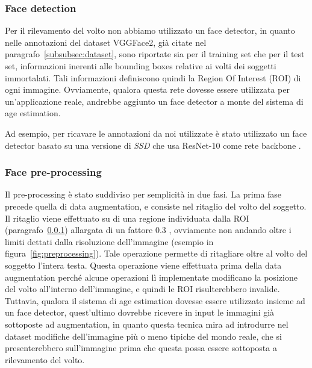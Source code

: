 \subsubsection{Face detection}
\label{subsubsec:face_detection}

Per il rilevamento del volto non abbiamo utilizzato un face detector, in quanto nelle annotazioni del dataset VGGFace2, già citate nel paragrafo~\ref{subsubsec:dataset}, sono riportate sia per il training set che per il test set, informazioni inerenti alle bounding boxes relative ai volti dei soggetti immortalati. Tali informazioni definiscono quindi la Region Of Interest (ROI) di ogni immagine.
Ovviamente, qualora questa rete dovesse essere utilizzata per un'applicazione reale, andrebbe aggiunto un face detector a monte del sistema di age estimation.

Ad esempio, per ricavare le annotazioni da noi utilizzate è stato utilizzato un face detector basato su una versione di \emph{SSD} che usa ResNet-10 come rete backbone \cite{miviagender}.

\subsubsection{Face pre-processing} 

Il pre-processing è stato suddiviso per semplicità in due fasi. La prima fase precede quella di data augmentation, e consiste nel ritaglio del volto del soggetto. Il ritaglio viene effettuato su di una regione individuata dalla ROI (paragrafo~\ref{subsubsec:face_detection}) allargata di un fattore $0.3$ \cite{vggface2dataset}, ovviamente non andando oltre i limiti dettati dalla risoluzione dell'immagine (esempio in figura~\ref{fig:preprocessing}). Tale operazione permette di ritagliare oltre al volto del soggetto l'intera testa. Questa operazione viene effettuata prima della data augmentation perché alcune operazioni lì implementate modificano la posizione del volto all'interno dell'immagine, e quindi le ROI risulterebbero invalide. Tuttavia, qualora il sistema di age estimation dovesse essere utilizzato insieme ad un face detector, quest'ultimo dovrebbe ricevere in input le immagini già sottoposte ad augmentation, in quanto questa tecnica mira ad introdurre nel dataset modifiche dell'immagine più o meno tipiche del mondo reale, che si presenterebbero sull'immagine prima che questa possa essere sottoposta a rilevamento del volto.

